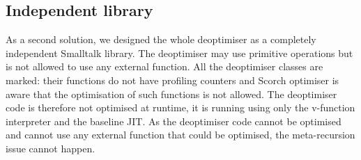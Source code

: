 \documentclass[a4paper,12pt,twoside]{../includes/ThesisStyle}
\begin{document}
\subsection{Independent library}
\label{sec:independentLib}

As a second solution, we designed the whole deoptimiser as a completely independent Smalltalk library. The deoptimiser may use primitive operations but is not allowed to use any external function. All the deoptimiser classes are marked: their functions do not have profiling counters and Scorch optimiser is aware that the optimisation of such functions is not allowed. The deoptimiser code is therefore not optimised at runtime, it is running using only the v-function interpreter and the baseline JIT. As the deoptimiser code cannot be optimised and cannot use any external function that could be optimised, the meta-recursion issue cannot happen.
\end{document}
